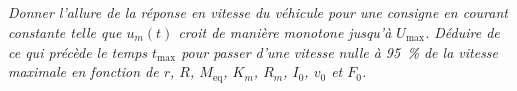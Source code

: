 \documentclass[10pt,fleqn]{article} %
\begin{document}
\begin{multicols}{2}
\subparagraph{}
\textit{Donner l’allure de la réponse en vitesse du véhicule pour une consigne en courant constante telle que $u_m(t)$ croit de manière monotone jusqu’à $U_{\text{max}}$. Déduire de ce qui précède le temps $t_{\text{max}}$ pour passer
d’une vitesse nulle à 95\, \% de la vitesse maximale en fonction de $r$, $R$, $M_{\text{eq}}$, 
$K_m$, $R_m$, $I_0$, $v_0$ et $F_0$.}
\ifprof
\begin{corrige}
\end{corrige}
\else
\fi

%
%
%
%


\end{multicols}
\end{document}
